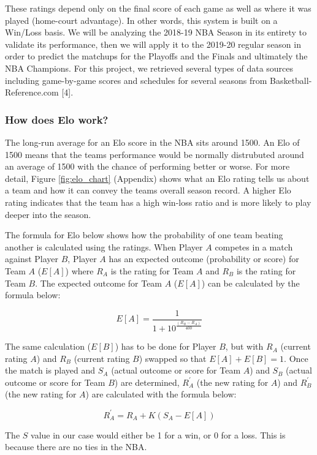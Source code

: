 \documentclass[]{article}
\begin{document}
These ratings depend only on the final score of each game as well as
where it was played (home-court advantage). In other words, this system
is built on a Win/Loss basis. We will be analyzing the 2018-19 NBA
Season in its entirety to validate its performance, then we will apply
it to the 2019-20 regular season in order to predict the matchups for
the Playoffs and the Finals and ultimately the NBA Champions. For this
project, we retrieved several types of data sources including
game-by-game scores and schedules for several seasons from
Basketball-Reference.com {[}4{]}.

\hypertarget{how-does-elo-work}{%
\subsubsection{How does Elo work?}\label{how-does-elo-work}}

The long-run average for an Elo score in the NBA sits around 1500. An
Elo of 1500 means that the teams performance would be normally
distrubuted around an average of 1500 with the chance of performing
better or worse. For more detail, Figure \ref{fig:elo_chart} (Appendix)
shows what an Elo rating tells us about a team and how it can convey the
teams overall season record. A higher Elo rating indicates that the team
has a high win-loss ratio and is more likely to play deeper into the
season.

The formula for Elo below shows how the probability of one team beating
another is calculated using the ratings. When Player \(A\) competes in a
match against Player \(B\), Player \(A\) has an expected outcome
(probability or score) for Team \(A\) (\(E[A]\)) where \(R_A\) is the
rating for Team \(A\) and \(R_B\) is the rating for Team \(B\). The
expected outcome for Team \(A\) (\(E[A]\)) can be calculated by the
formula below:

\[
E[A] = \frac{1}{1 + 10^{\frac{(R_B-R_A)}{400}}}
\]

The same calculation (\(E[B]\)) has to be done for Player \(B\), but
with \(R_A\) (current rating \(A\)) and \(R_B\) (current rating \(B\))
swapped so that \(E[A] + E[B] = 1\). Once the match is played and
\(S_A\) (actual outcome or score for Team \(A\)) and \(S_B\) (actual
outcome or score for Team \(B\)) are determined, \(R^{\prime}_A\) (the
new rating for \(A\)) and \(R^{\prime}_B\) (the new rating for \(A\))
are calculated with the formula below:

\[
R^{\prime}_A=R_A+K(S_A-E[A])
\]

The \(S\) value in our case would either be 1 for a win, or 0 for a
loss. This is because there are no ties in the NBA.
\end{document}
